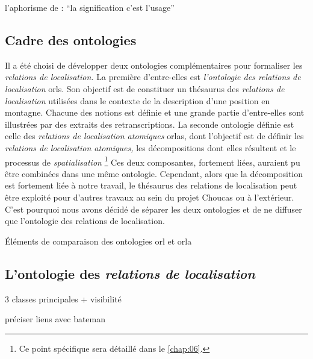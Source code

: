 

l'aphorisme de  : \enquote{la signification c'est
  l'usage}

\subsection{Cadre des ontologies}

Il a été choisi de développer deux ontologies complémentaires pour
formaliser les \emph{relations de localisation.} La première
d'entre-elles est \emph{l'ontologie des relations de localisation}
\acp{orl}. Son objectif est de constituer un thésaurus des
\emph{relations de localisation} utilisées dans le contexte de la
description d'une position en montagne. Chacune des notions est
définie et une grande partie d'entre-elles sont illustrées par des
extraits des retranscriptions. La seconde ontologie définie est celle
des \emph{relations de localisation atomiques} \acp{orla}, dont
l'objectif est de définir les \emph{relations de localisation
  atomiques,} les décompositions dont elles résultent et le processus
de \emph{spatialisation} \footnote{Ce point spécifique sera détaillé
  dans le \autoref{chap:06}.} Ces deux composantes, fortement liées,
auraient pu être combinées dans une même ontologie. Cependant, alors
que la décomposition est fortement liée à notre travail, le thésaurus
des relations de localisation peut être exploité pour d'autres travaux
au sein du projet Choucas ou à l'extérieur. C'est pourquoi nous avons
décidé de séparer les deux ontologies et de ne diffuser que
l'ontologie des relations de localisation.

\begin{table}
  \centering
  
  \caption{Éléments de comparaison des ontologies \ac{orl} et
    \ac{orla}}
  \label{tab:orl_vs_orla}
\end{table}


\subsection{L'ontologie des \emph{relations de localisation}}

3 classes principales + visibilité

préciser liens avec bateman

